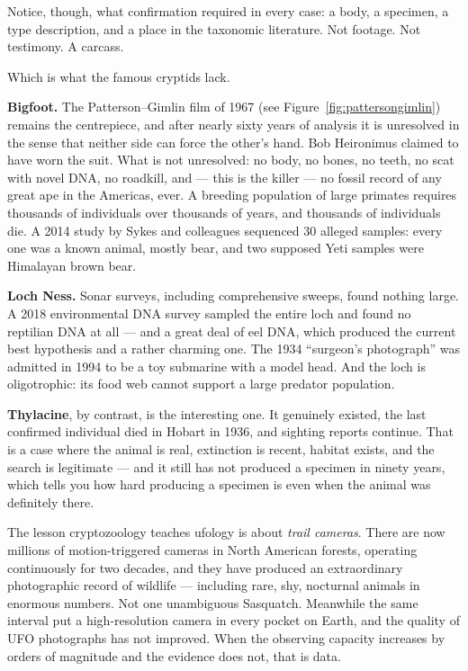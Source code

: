 Notice, though, what confirmation required in every case: a body, a specimen, a type description,
and a place in the taxonomic literature. Not footage. Not testimony. A carcass.

Which is what the famous cryptids lack.

\textbf{Bigfoot.} The Patterson--Gimlin film of 1967 (see Figure~\ref{fig:pattersongimlin}) remains the centrepiece, and after nearly
sixty years of analysis it is unresolved in the sense that neither side can force the other's
hand. Bob Heironimus claimed to have worn the suit. What is not unresolved: no body, no bones, no
teeth, no scat with novel DNA, no roadkill, and --- this is the killer --- no fossil record of
any great ape in the Americas, ever. A breeding population of large primates requires thousands of
individuals over thousands of years, and thousands of individuals die. A 2014 study by Sykes and
colleagues sequenced 30 alleged samples: every one was a known animal, mostly bear, and two
supposed Yeti samples were Himalayan brown bear.

\textbf{Loch Ness.} Sonar surveys, including comprehensive sweeps, found nothing large. A 2018
environmental DNA survey sampled the entire loch and found no reptilian DNA at all --- and a great
deal of eel DNA, which produced the current best hypothesis and a rather charming one. The 1934
``surgeon's photograph'' was admitted in 1994 to be a toy submarine with a model head. And the
loch is oligotrophic: its food web cannot support a large predator population.

\textbf{Thylacine}, by contrast, is the interesting one. It genuinely existed, the last confirmed
individual died in Hobart in 1936, and sighting reports continue. That is a case where the animal
is real, extinction is recent, habitat exists, and the search is legitimate --- and it still has
not produced a specimen in ninety years, which tells you how hard producing a specimen is even
when the animal was definitely there.

\begin{funfact}
The lesson cryptozoology teaches ufology is about \emph{trail cameras}. There are now millions of
motion-triggered cameras in North American forests, operating continuously for two decades, and
they have produced an extraordinary photographic record of wildlife --- including rare, shy,
nocturnal animals in enormous numbers. Not one unambiguous Sasquatch. Meanwhile the same interval
put a high-resolution camera in every pocket on Earth, and the quality of UFO photographs has
not improved. When the observing capacity increases by orders of magnitude and the evidence does
not, that is data.
\end{funfact}

